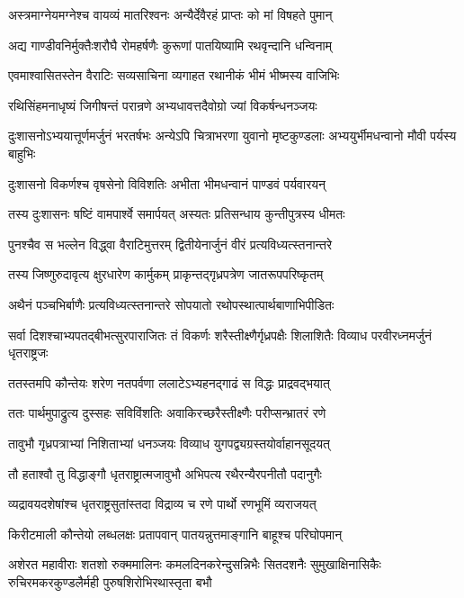 \twolineshloka
{अस्त्रमाग्नेयमग्नेश्च वायव्यं मातरिश्वनः}
{अन्यैर्देवैरहं प्राप्तः को मां विषहते पुमान्}


\twolineshloka
{अद्य गाण्डीवनिर्मुक्तैःशरौघै रोमहर्षणैः}
{कुरूणां पातयिष्यामि रथवृन्दानि धन्विनाम्}



\twolineshloka
{एवमाश्वासितस्तेन वैराटिः सव्यसाचिना}
{व्यगाहत रथानीकं भीमं भीष्मस्य वाजिभिः}


\twolineshloka
{रथिसिंहमनाधृष्यं जिगीषन्तं परान्रणे}
{अभ्यधावत्तदैवोग्रो ज्यां विकर्षन्धनञ्जयः}


\onelineshloka
{दुःशासनोऽभ्ययात्तूर्णमर्जुनं भरतर्षभः}
\twolineshloka
{अन्येऽपि चित्राभरणा युवानो मृष्टकुण्डलाः}
{अभ्ययुर्भीमधन्वानो मौवी पर्यस्य बाहुभिः}


\twolineshloka
{दुःशासनो विकर्णश्च वृषसेनो विविशतिः}
{अभीता भीमधन्वानं पाण्डवं पर्यवारयन्}


\twolineshloka
{तस्य दुःशासनः षष्टिं वामपार्श्वे समार्पयत्}
{अस्यतः प्रतिसन्धाय कुन्तीपुत्रस्य धीमतः}


\twolineshloka
{पुनश्चैव स भल्लेन विद्ध्वा वैराटिमुत्तरम्}
{द्वितीयेनार्जुनं वीरं प्रत्यविध्यत्स्तनान्तरे}


\twolineshloka
{तस्य जिष्णुरुदावृत्य क्षुरधारेण कार्मुकम्}
{प्राकृन्तद्गृध्रपत्रेण जातरूपपरिष्कृतम्}


\twolineshloka
{अथैनं पञ्चभिर्बाणैः प्रत्यविध्यत्स्तनान्तरे}
{सोपयातो रथोपस्थात्पार्थबाणाभिपीडितः}


\threelineshloka
{सर्वा दिशश्चाभ्यपतद्बीभत्सुरपाराजितः}
{तं विकर्णः शरैस्तीक्ष्णैर्गृध्रपक्षैः शिलाशितैः}
{विव्याध परवीरध्नमर्जुनं धृतराष्ट्रजः}


\twolineshloka
{ततस्तमपि कौन्तेयः शरेण नतपर्वणा}
{ललाटेऽभ्यहनद्गाढं स विद्धः प्राद्रवद्भयात्}


\twolineshloka
{ततः पार्थमुपाद्रुत्य दुस्सहः सविविंशतिः}
{अवाकिरच्छरैस्तीक्ष्णैः परीप्सन्भ्रातरं रणे}


\twolineshloka
{तावुभौ गृध्रपत्राभ्यां निशिताभ्यां धनञ्जयः}
{विव्याध युगपद्व्यग्रस्तयोर्वाहानसूदयत्}


\twolineshloka
{तौ हताश्वौ तु विद्धाङ्गौ धृतराष्ट्रात्मजावुभौ}
{अभिपत्य रथैरन्यैरपनीतौ पदानुगैः}


\twolineshloka
{व्यद्रावयदशेषांश्च धृतराष्ट्रसुतांस्तदा}
{विद्राव्य च रणे पार्थो रणभूमिं व्यराजयत्}


\twolineshloka
{किरीटमाली कौन्तेयो लब्धलक्षः प्रतापवान्}
{पातयन्नुत्तमाङ्गानि बाहूश्च परिघोपमान्}


\onelineshloka
{अशेरत महावीराः शतशो रुक्ममालिनः}
\twolineshloka
{कमलदिनकरेन्दुसन्निभैः सितदशनैः सुमुखाक्षिनासिकैः}
{रुचिरमकरकुण्डलैर्मही पुरुषशिरोभिरथास्तृता बभौ}



